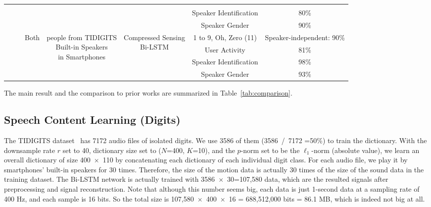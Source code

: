 \begin{landscape}
\begin{table}[h]
\begin{tabular}{cccccc}
			&&&&& \\ \cline{5-6}
			&&&&Speaker Identification& 80\%\\ \cline{5-6}
			&&&&Speaker Gender& 90\%\\
			\midrule[0.5pt]
			\multirow{4}{*}{~~~\systemName} & \multirow{4}{*}{Both} & \multirow{4}{*}{\parbox{3.5cm}{ people from TIDIGITS \\Built-in Speakers \\in Smartphones}} & \multirow{4}{*}{\parbox{1.8cm}{\centering Compressed Sensing\\Bi-LSTM} } &1 to 9, Oh, Zero (11) &Speaker-independent: 90\%\\ \cline{5-6}
			&&&&User Activity& 81\%\\ \cline{5-6}
			&&&&Speaker Identification& 98\%\\ \cline{5-6}
			&&&&Speaker Gender& 93\%\\
			\midrule[0.3pt]\bottomrule[1pt]
		\end{tabular}
	\end{table}
\end{landscape}

%
The main result and the comparison to prior works are summarized in Table~\ref{tab:comparison}. 


\subsection{Speech Content Learning  (Digits)}

The TIDIGITS dataset~\cite{leonard1993tidigits} has 7172 audio files of isolated digits. We use 3586 of them (3586~/~7172 =50\%) to train the dictionary. With the downsample rate $r$ set to 40, dictionary size set to ($N$=400, $K$=10), and the $p$-norm set to be the $\ell_1$-norm (absolute value), we learn an overall dictionary of size 400~$\times$~110 by concatenating each dictionary of each individual digit class. 
%
For each audio file, we play it by smartphones' built-in speakers for 30 times. Therefore, the size of the motion data is actually 30 times of the size of the sound data in the training dataset. The Bi-LSTM network is actually trained with 3586~$\times$~30=107,580 data, which are the resulted signals after preprocessing and signal reconstruction. Note that although this number seems big, each data is just 1-second data at a sampling rate of 400 Hz, and each sample is 16 bits. So the total size is 107,580~$\times$~400~$\times$~16 = 688,512,000 bits = 86.1 MB, which is indeed not big at all.


